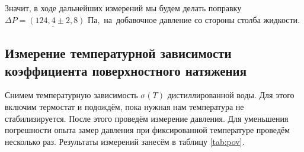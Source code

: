 \documentclass[a4paper, 12pt]{article}
\begin{document}
    \noindent Значит, в ходе дальнейших измерений мы будем делать поправку \label{popravka} $  \underline{\Delta P = (124,4 \pm 2,8) \text{ Па},}$ на~добавочное давление со стороны столба жидкости.

    \subsection*{Измерение температурной зависимости коэффициента поверхностного натяжения}
  
    \noindent Снимем температурную зависимость $\sigma(T)$ дистиллированной воды. Для этого включим термостат и подождём, пока нужная нам температура не стабилизируется. После этого проведём измерение давления. Для уменьшения погрешности опыта замер давления  при фиксированной температуре проведём несколько раз. Результаты измерений занесём в таблицу \ref{tab:pov}.
    
\end{document}
